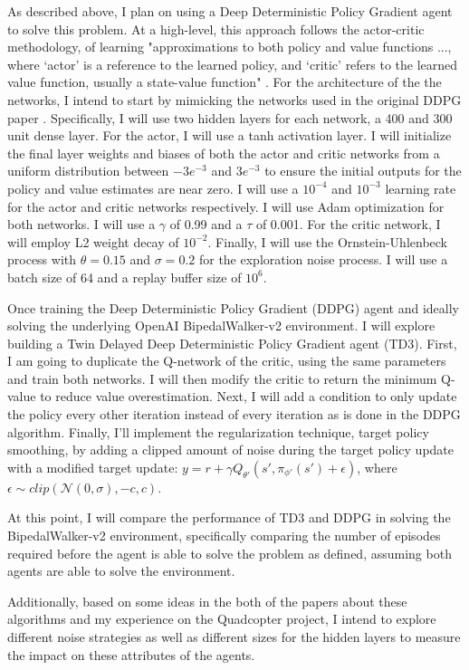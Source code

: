 \documentclass{article}
\begin{document}
As described above, I plan on using a Deep Deterministic Policy Gradient agent to solve this problem. At a high-level, this approach follows the actor-critic methodology, of learning "approximations to both policy and value functions ..., where ‘actor’ is a reference to the learned policy, and ‘critic’ refers to the learned value function, usually a state-value function" \cite{Sutton:2018:RLI:3312046}. For the architecture of the the networks, I intend to start by mimicking the networks used in the original DDPG paper \cite{DBLP:journals/corr/LillicrapHPHETS15}. Specifically, I will use two hidden layers for each network, a 400 and 300 unit dense layer. For the actor, I will use a tanh activation layer. I will initialize the final layer weights and biases of both the actor and critic networks from a uniform distribution between $-3e^{-3}$ and $3e^{-3}$ to ensure the initial outputs for the policy and value estimates are near zero. I will use a $10^{-4}$ and $10^{-3}$ learning rate for the actor and critic networks respectively. I will use Adam optimization for both networks. I will use a $\gamma$ of 0.99 and a $\tau$ of 0.001. For the critic network, I will employ L2 weight decay of $10^{-2}$. Finally, I will use the Ornstein-Uhlenbeck process with $\theta = 0.15$ and $\sigma = 0.2$ for the exploration noise process. I will use a batch size of 64 and a replay buffer size of $10^{6}$. 

Once training the Deep Deterministic Policy Gradient (DDPG) agent and ideally solving the underlying OpenAI BipedalWalker-v2 environment. I will explore building a Twin Delayed Deep Deterministic Policy Gradient agent (TD3). First, I am going to duplicate the Q-network of the critic, using the same parameters and train both networks. I will then modify the critic to return the minimum Q-value to reduce value overestimation. Next, I will add a condition to only update the policy every other iteration instead of every iteration as is done in the DDPG algorithm. Finally, I'll implement the regularization technique, target policy smoothing, by adding a clipped amount of noise during the target policy update with a modified target update: $y=r+\gamma Q_{\theta'} (s', \pi_{\phi'}(s')+ \epsilon)$, where $\epsilon \sim clip(\mathcal{N}(0, \sigma), -c, c)$.

At this point, I will compare the performance of TD3 and DDPG in solving the BipedalWalker-v2 environment, specifically comparing the number of episodes required before the agent is able to solve the problem as defined, assuming both agents are able to solve the environment.

Additionally, based on some ideas in the both of the papers about these algorithms and my experience on the Quadcopter project, I intend to explore different noise strategies as well as different sizes for the hidden layers to measure the impact on these attributes of the agents.

  

\end{document}
